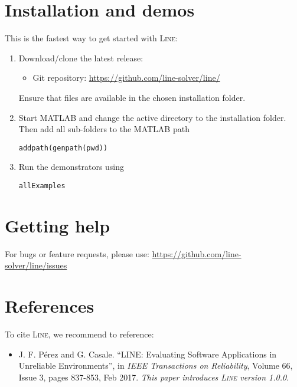 \section{Installation and demos}
\label{installation-and-demos}
This is the fastest way to get started with \textsc{Line}:
\begin{enumerate}
\item Download/clone the latest release:
\begin{itemize}
\item Git repository: \url{https://github.com/line-solver/line/}
\end{itemize}
Ensure that files are available in the chosen installation folder.

\item Start MATLAB and change the active directory to the installation folder. Then add all sub-folders to the MATLAB path
\begin{lstlisting}
addpath(genpath(pwd))
\end{lstlisting}
\item Run the demonstrators using
\begin{lstlisting}
allExamples
\end{lstlisting}
\end{enumerate}

\section{Getting help}
For bugs or feature requests, please use: \url{https://github.com/line-solver/line/issues}

\section{References}
\label{references}
\noindent To cite \textsc{Line}, we recommend to reference:
\begin{itemize}
\item \noindent J. F. P\'erez and G. Casale. ``LINE: Evaluating Software Applications in Unreliable Environments'', in {\em IEEE Transactions on Reliability}, Volume 66, Issue 3, pages 837-853, Feb 2017. {\em This paper introduces \textsc{Line} version 1.0.0}.
\end{itemize}


